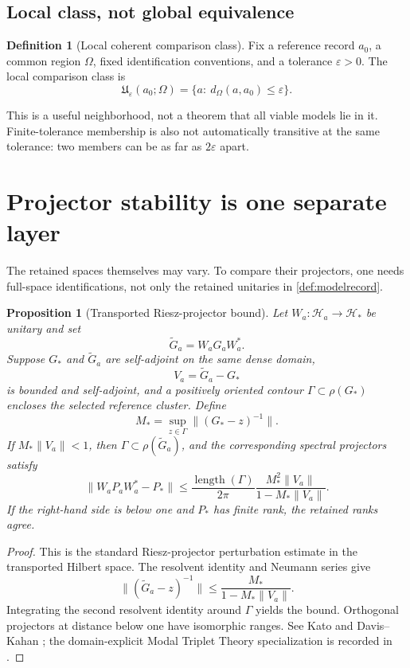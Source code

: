 \documentclass[11pt]{article}
\newtheorem{proposition}[theorem]{Proposition}
\theoremstyle{definition}
\newtheorem{definition}[theorem]{Definition}
\theoremstyle{remark}
\newcommand{\cH}{\mathcal H}
\newcommand{\1}{\mathbf 1}
\newcommand{\MTT}{Modal Triplet Theory}
\begin{document}
\subsection{Local class, not global equivalence}

\begin{definition}[Local coherent comparison class]
Fix a reference record \(a_0\), a common region \(\Omega\), fixed
identification conventions, and a tolerance \(\varepsilon>0\).  The local
comparison class is
\[
 \mathfrak U_\varepsilon(a_0;\Omega)
 =
 \{a:\ d_\Omega(a,a_0)\leq\varepsilon\}.
\]
\end{definition}

This is a useful neighborhood, not a theorem that all viable models lie in
it.  Finite-tolerance membership is also not automatically transitive at
the same tolerance: two members can be as far as \(2\varepsilon\) apart.

\section{Projector stability is one separate layer}
\label{sec:projector}

The retained spaces themselves may vary.  To compare their projectors, one
needs full-space identifications, not only the retained unitaries in
\cref{def:modelrecord}.

\begin{proposition}[Transported Riesz-projector bound]
\label{prop:riesz}
Let \(W_a:\cH_a\to\cH_*\) be unitary and set
\[
 \widetilde G_a=W_aG_aW_a^*.
\]
Suppose \(G_*\) and \(\widetilde G_a\) are self-adjoint on the same dense
domain,
\[
 V_a=\widetilde G_a-G_*
\]
is bounded and self-adjoint, and a positively oriented contour
\(\Gamma\subset\rho(G_*)\) encloses the selected reference cluster.  Define
\[
 M_*=\sup_{z\in\Gamma}\|(G_*-z)^{-1}\|.
\]
If \(M_*\|V_a\|<1\), then \(\Gamma\subset\rho(\widetilde G_a)\), and the
corresponding spectral projectors satisfy
\[
 \|W_aP_aW_a^*-P_*\|
 \leq
 \frac{\operatorname{length}(\Gamma)}{2\pi}
 \frac{M_*^2\|V_a\|}
      {1-M_*\|V_a\|}.
\]
If the right-hand side is below one and \(P_*\) has finite rank, the
retained ranks agree.
\end{proposition}

\begin{proof}
This is the standard Riesz-projector perturbation estimate in the
transported Hilbert space.  The resolvent identity and Neumann series give
\[
 \|(\widetilde G_a-z)^{-1}\|
 \leq
 \frac{M_*}{1-M_*\|V_a\|}.
\]
Integrating the second resolvent identity around \(\Gamma\) yields the
bound.  Orthogonal projectors at distance below one have isomorphic
ranges.  See Kato and Davis--Kahan
\cite{Kato1995,DavisKahan1970}; the domain-explicit \MTT{} specialization
is recorded in \cite{MTTCoherentReduction2026}.
\end{proof}
\end{document}
